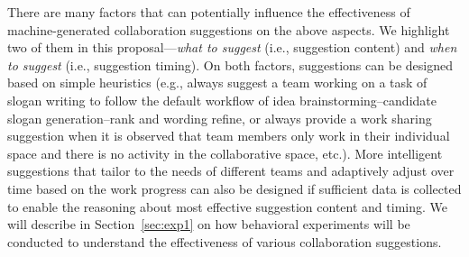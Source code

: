 There are many factors that can potentially influence the effectiveness of machine-generated collaboration suggestions on the above aspects. We highlight two of them in this proposal---{\em what to suggest} (i.e., suggestion content) and {\em when to suggest} (i.e., suggestion timing). On both factors, suggestions can be designed based on simple heuristics (e.g., always suggest a team working on a task of slogan writing to follow the default workflow of idea brainstorming--candidate slogan generation--rank and wording refine, or always provide a work sharing suggestion when it is observed that team members only work in their individual space and there is no activity in the collaborative space, etc.). More intelligent suggestions that tailor to the needs of different teams and adaptively adjust over time based on the work progress can also be designed if sufficient data is collected to enable the reasoning about most effective suggestion content and timing. We will describe in Section~\ref{sec:exp1} on how behavioral experiments will be conducted to understand the effectiveness of various collaboration suggestions.





